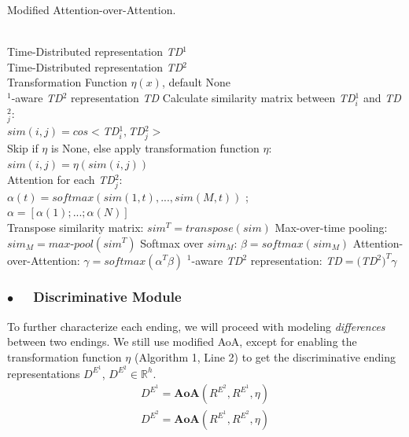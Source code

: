 \documentclass[letterpaper]{article} %
\begin{document}
\begin{algorithm}[tb]
\caption{Modified Attention-over-Attention.}   
\label{alg:modified-aoa}   
\begin{algorithmic}[1] %
\REQUIRE ~~\\ %
Time-Distributed representation {\em TD}$^1$ \\
Time-Distributed representation {\em TD}$^2$ \\
Transformation Function $\eta(x)$, default None \\
$^1$-aware {\em TD}$^2$ representation {\em TD} 
\STATE Calculate similarity matrix between {\em TD}$^1_i$ and {\em TD}$^2_j$: \\$sim(i,j) = cos<${\em TD}$^1_i, ${\em TD}$^2_j>$ \\
\STATE Skip if $\eta$ is None, else apply transformation function $\eta$: \\$sim(i,j) = \eta(sim(i,j))$ \\
\STATE Attention for each {\em TD}$^2_j$: \\
$\alpha(t)=softmax(sim(1,t), ..., sim(M,t))$ ; \\
$\alpha = [\alpha(1); ...; \alpha(N)]$ \\
\STATE Transpose similarity matrix: $sim^T = transpose(sim)$
\STATE Max-over-time pooling: $sim_{M}=max\text{-}pool(sim^T)$	%
\STATE Softmax over $sim_{M}$: $\beta = softmax(sim_{M})$
\STATE Attention-over-Attention: $\gamma = softmax(\alpha^{T} \beta) $
$^1$-aware {\em TD}$^2$ representation: {\em TD}$ = (${\em TD}${^2})^T \gamma$
\end{algorithmic}  
\end{algorithm}


\subsubsection*{$\bullet$~~ Discriminative Module}
To further characterize each ending, we will proceed with modeling {\em differences} between two endings. 
We still use modified AoA, except for enabling the transformation function $\eta$ (Algorithm 1, Line 2) to get the discriminative ending representations $D^{E^1}$, $D^{E^2}\in\mathbb{R}^{h}$. 
\begin{gather}
D^{E^1} = \mathbf{AoA}(R^{E^2}, R^{E^1}, \eta) \\
D^{E^2} = \mathbf{AoA}(R^{E^1}, R^{E^2}, \eta)
\end{gather}
\end{document}
